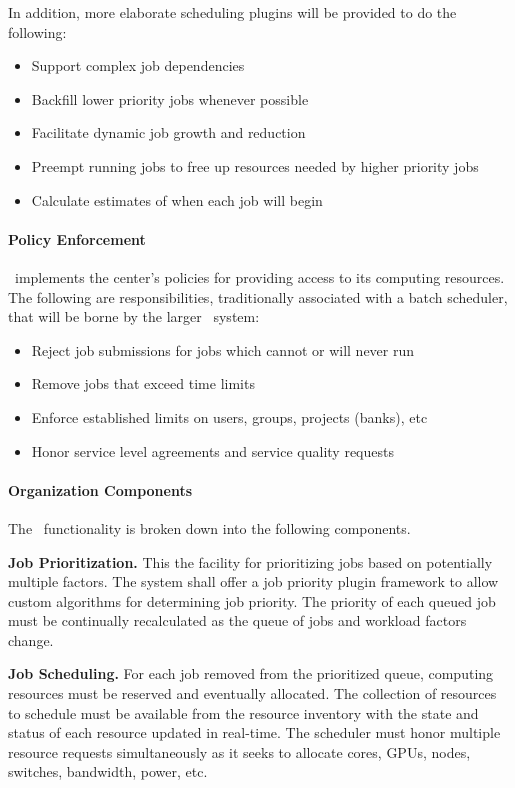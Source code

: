 In addition, more elaborate scheduling plugins will be provided to do
the following:

\begin{itemize}
  \item Support complex job dependencies
  \item Backfill lower priority jobs whenever possible
  \item Facilitate dynamic job growth and reduction
  \item Preempt running jobs to free up resources needed by higher priority jobs
  \item Calculate estimates of when each job will begin
\end{itemize}

\paragraph{Policy Enforcement}

\ngrm\ implements the center's policies for providing access to its
computing resources.  The following are responsibilities,
traditionally associated with a batch scheduler, that will be borne by
the larger \ngrm\ system:

\begin{itemize}
  \item Reject job submissions for jobs which cannot or will never run
  \item Remove jobs that exceed time limits
  \item Enforce established limits on users, groups, projects (banks), etc
  \item Honor service level agreements and service quality requests
\end{itemize}

\paragraph{Organization Components}

The \ngjs\ functionality is broken down into the following components.

\textbf{Job Prioritization.}  This the facility for prioritizing jobs
based on potentially multiple factors.  The system shall offer a job
priority plugin framework to allow custom algorithms for determining
job priority.  The priority of each queued job must be continually
recalculated as the queue of jobs and workload factors change.

\textbf{Job Scheduling.} For each job removed from the prioritized
queue, computing resources must be reserved and eventually allocated.
The collection of resources to schedule must be available from the
resource inventory with the state and status of each resource updated
in real-time.  The scheduler must honor multiple resource requests
simultaneously as it seeks to allocate cores, GPUs, nodes, switches,
bandwidth, power, etc.

